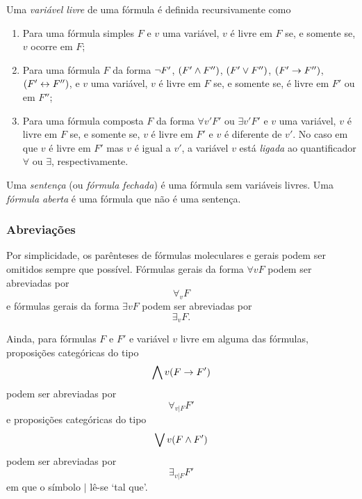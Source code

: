 Uma \emph{variável livre} de uma fórmula é definida recursivamente como
	\begin{enumerate}
	\item Para uma fórmula simples $F$ e $v$ uma variável, $v$ é livre em $F$ se, e somente se, $v$ ocorre em $F$;
	
	\item Para uma fórmula $F$ da forma $\lnot F'$, $(F' \land F'')$, $(F' \lor F'')$, $(F' \rightarrow F'')$, $(F' \leftrightarrow F'')$, e $v$ uma variável, $v$ é livre em $F$ se, e somente se, é livre em $F'$ ou em $F''$;
	
	\item Para uma fórmula composta $F$ da forma $\forall v' F'$ ou $\exists v' F'$ e $v$ uma variável, $v$ é livre em $F$ se, e somente se, $v$ é livre em $F'$ e $v$ é diferente de $v'$. No caso em que $v$ é livre em $F'$ mas $v$ é igual a $v'$, a variável $v$ está \emph{ligada} ao quantificador $\forall$ ou $\exists$, respectivamente.
	\end{enumerate}

Uma \emph{sentença} (ou \emph{fórmula fechada}) é uma fórmula sem variáveis livres. Uma \emph{fórmula aberta} é uma fórmula que não é uma sentença.

\subsubsection{Abreviações}

Por simplicidade, os parênteses de fórmulas moleculares e gerais podem ser omitidos sempre que possível. Fórmulas gerais da forma $\forall v F$ podem ser abreviadas por
	\begin{equation*}
	\forall_v F
	\end{equation*}
e fórmulas gerais da forma $\exists v F$ podem ser abreviadas por
	\begin{equation*}
	\exists_v F.
	\end{equation*}

Ainda, para fórmulas $F$ e $F'$ e variável $v$ livre em alguma das fórmulas, proposições categóricas do tipo
	\begin{equation*}
	\bigwedge\nolimits v(F \rightarrow F')
	\end{equation*}
podem ser abreviadas por
	\begin{equation*}
	\forall_{v | F} F'
	\end{equation*}
e proposições categóricas do tipo
	\begin{equation*}
	\bigvee\nolimits v(F \land F')
	\end{equation*}
podem ser abreviadas por
	\begin{equation*}
	\exists_{v | F} F'
	\end{equation*}
em que o símbolo $|$ lê-se `tal que'.

